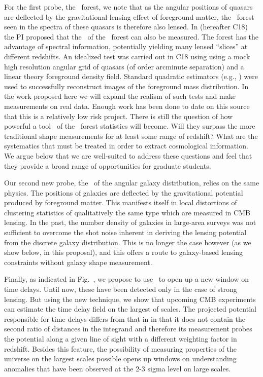For the first probe, the \lya\ forest, we note that as the angular 
positions of quasars are deflected by the 
gravitational lensing effect of foreground matter, the \lya\ forest 
seen in the spectra of these quasars is 
therefore also lensed.
In \cite{croft17} (hereafter C18)
 the PI proposed that the 
\atf\ of the \lya\ forest
can also be measured.
The forest has the advantage of spectral information,
potentially yielding many lensed ``slices'' at different redshifts.
An idealized test was carried out in C18 using
using a mock  high resolution angular grid of quasars (of order arcminute separation) and a linear theory foreground density
field. Standard quadratic estimators (e.g., \cite{okamoto})  
were used to successfully  reconstruct images of the foreground mass 
distribution. In the work proposed here we will expand the realism
of such tests and make measurements on real data. Enough work has been done to date on this source that this is a relatively low risk
project. There is still the question of how powerful a tool \atf\ of the \lya\ forest statistics will become. Will they surpass the more traditional shape measurements for at least some range of redshift? What are the systematics that must be treated in order to extract cosmological information. We argue below that we are well-suited to address these questions and feel that they provide a broad range of opportunities for graduate students.

Our second new probe, the \atf\ 
of the angular galaxy distribution,
relies on the same physics. The positions
of galaxies are deflected by the gravitational potential produced by
foreground matter. This manifests itself in local distortions of
clustering statistics of qualitatively 
the same type which are measured in CMB lensing.
In the past, the number density of galaxies in large-area surveys 
was not sufficient to overcome the shot noise inherent in deriving
the lensing potential from the discrete galaxy distribution. This is
no longer the case however (as we show below, in this proposal), and
this offers a route to galaxy-based lensing constraints without
galaxy shape measurement.

Finally, as indicated in Fig.~, we propose to use \atf\ to open up a new window on time delays. Until now, these have been detected only in the case of strong lensing. But using the new technique, we show that upcoming CMB experiments can estimate the time delay field on the largest of scales. The projected potential responsible for time delays differs from that in  in that it does not contain the second ratio of distances in the integrand and therefore its measurement probes the potential along a given line of sight with a different weighting factor in redshift. Besides this feature, the possibility of measuring properties of the universe on the largest scales possible opens up windows on understanding anomalies that have been observed at the 2-3 sigma level on large scales. 


